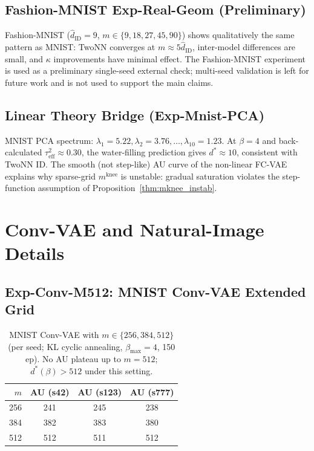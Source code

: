 \documentclass[make,article,submit,pdftex,moreauthors]{Definitions/mdpi}
\newcommand{\kap}{\kappa}
\newcommand{\mknee}{m^{\mathrm{knee}}}
\newcommand{\hatdID}{\hat{d}_{\mathrm{ID}}}
\begin{document}
\subsection{Fashion-MNIST Exp-Real-Geom (Preliminary)}

Fashion-MNIST ($\hatdID=9$, $m\in\{9,18,27,45,90\}$) shows qualitatively the
same pattern as MNIST: TwoNN converges at $m\approx5\hatdID$, inter-model
differences are small, and $\kap$ improvements have minimal effect.
The Fashion-MNIST experiment is used as a preliminary single-seed external check;
multi-seed validation is left for future work and is not used to support the main claims.

\subsection{Linear Theory Bridge (Exp-Mnist-PCA)}

MNIST PCA spectrum: $\lambda_1=5.22, \lambda_2=3.76,\ldots,\lambda_{10}=1.23$.
At $\beta=4$ and back-calculated $\tau^2_{\mathrm{eff}}\approx0.30$, the
water-filling prediction gives $d^*\approx10$, consistent with TwoNN ID.
The smooth (not step-like) AU curve of the non-linear FC-VAE explains why
sparse-grid $\mknee$ is unstable: gradual saturation violates the
step-function assumption of Proposition~\ref{thm:mknee_instab}.

\section{Conv-VAE and Natural-Image Details}\label{app:convvae_natimg}

\subsection{Exp-Conv-M512: MNIST Conv-VAE Extended Grid}

\begin{table}[H]
\centering
\caption{MNIST Conv-VAE with $m\in\{256,384,512\}$ (per seed; KL cyclic annealing,
$\beta_{\max}=4$, 150 ep).
No AU plateau up to $m=512$; $d^*(\beta)>512$ under this setting.}
\small
\begin{tabular}{rccc}
\toprule
$m$ & AU (s42) & AU (s123) & AU (s777) \\
\midrule
256 & 241 & 245 & 238 \\
384 & 382 & 383 & 380 \\
512 & 512 & 511 & 512 \\
\bottomrule
\end{tabular}
\end{table}
\end{document}
